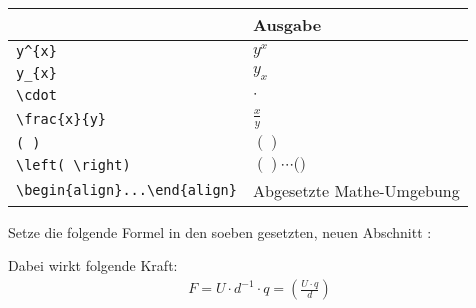 \documentclass["WS\space 16-17\space -\space LaTeX-Kurs\space -\space Praesentation\space -\space 1.tex"]{subfiles}
\begin{document}
\begin{frame}[fragile]
	\begin{center}
		\begin{tabular}{ll}
			\toprule
			\color{math-cmd}{Mathe}\color{black}{-Befehl}						&	Ausgabe						\\ \midrule
			\lstinline|y^{x}|			&	$y^{x}$						\\
			\lstinline|y_{x}|			&	$y_{x}$						\\
			\lstinline|\cdot|			&	$\cdot$						\\
			\lstinline|\frac{x}{y}|		&	$\frac{x}{y}$				\\ \addlinespace[0.5em]
			\lstinline|( )|				&	$( )$						\\
			\lstinline|\left( \right)|	&	$( ) \cdots \bigg( \bigg)$	\\ \midrule
			\lstinline|\begin{align}...\end{align}|	&	Abgesetzte Mathe-Umgebung	\\
			\bottomrule
		\end{tabular}
	\end{center}
	\pause\btVFill
	\Aufgabee
	Setze die folgende Formel in den soeben gesetzten, neuen Abschnitt :
	\begin{outputbox}
		Dabei wirkt folgende Kraft:
		\begin{align}
			F = U \cdot d^{-1} \cdot q = \left( \frac{U \cdot q}{d} \right) 
		\end{align}
	\end{outputbox}
	\vspace{0.3cm}
\end{frame}
\end{document}

